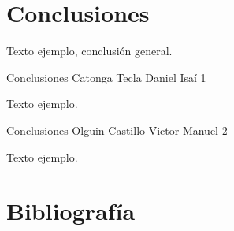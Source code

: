 \documentclass[12pt,twoside]{article}
\begin{document}
\newpage
\section{Conclusiones}

Texto ejemplo, conclusión general.
\medskip

Conclusiones Catonga Tecla Daniel Isaí 1
\par
Texto ejemplo.

\medskip

Conclusiones Olguin Castillo Victor Manuel 2
\par
Texto ejemplo.

\newpage
\section{Bibliograf\'ia}

\printbibliography[title={ }]
\end{document}
